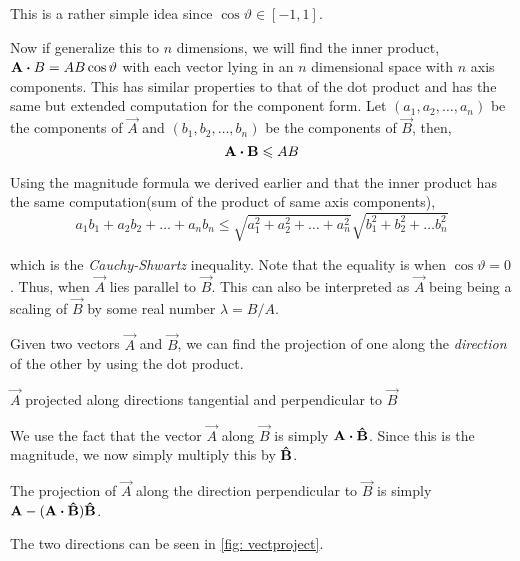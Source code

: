 This is a rather simple idea since \(\cos\vartheta \in [-1, 1]\). 

Now if generalize this to \(n\) dimensions, we will find the inner product,
\(\vec{A} \dtp {B} = AB \cos\vartheta\) with each 
vector lying in an \(n\) dimensional space with \(n\) axis components. This has similar properties to that of the dot 
product and has the same but extended computation for 
the component form. Let \((a_1, a_2, \dots, a_n)\) be the components of \(\vec{A}\) and 
\((b_1, b_2, \dots, b_n)\) be the components of \(\vec{B}\), then,
\begin{equation*}
    \vec{A} \dtp \vec{B} \le AB
\end{equation*}

Using the magnitude formula we derived earlier and that the inner product has the same 
computation(sum of the product of same axis components),
\begin{equation}
    a_1b_1 + a_2b_2 + \dots + a_nb_n \le \sqrt{a_1^2 + a_2^2 + \dots + a_n^2}\sqrt{b_1^2 + b_2^2 + \dots b_n^2}
\end{equation}

which is the \emph{Cauchy-Shwartz} inequality. Note that the equality is when \(\cos\vartheta=0\).
Thus, when \(\vec{A}\) lies parallel to \(\vec{B}\). This can also be interpreted as \(\vec{A}\) being 
being a scaling of \(\vec{B}\) by some real number \(\lambda = B/A\). 

Given two vectors \(\vec{A}\) and \(\vec{B}\), we can find the projection of one along the \emph{direction} of 
the other by using the dot product.

\begin{marginfigure}
    \centering
    \caption{\(\vec{A}\) projected along directions tangential and 
    perpendicular to \(\vec{B}\)}
    \label{fig: vectproject}
\end{marginfigure}

We use the fact that the vector \(\vec{A}\) along \(\vec{B}\) is simply 
\(\vec{A} \dtp \unitv{B}\). Since this is the magnitude, we now simply 
multiply this by \(\boldsymbol{\mathbf{\hat{B}}}\). 

The projection of \(\vec{A}\) along the direction perpendicular
to \(\vec{B}\) is simply \(\vec{A} - (\vec{A} \dtp \unitv{B})\unitv{B}\). 

The two directions can be seen in \cref{fig: vectproject}.

